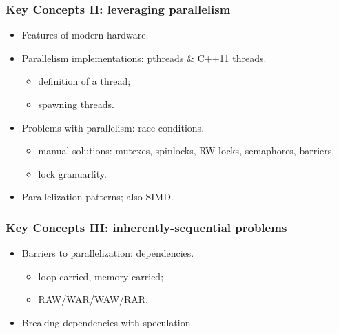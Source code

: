\documentclass[aspectratio=43]{beamer}
\newenvironment{changemargin}[1]{%
  \begin{list}{}{%
    \setlength{\topsep}{0pt}%
    \setlength{\leftmargin}{#1}%
    \setlength{\rightmargin}{1em}
    \setlength{\listparindent}{\parindent}%
    \setlength{\itemindent}{\parindent}%
    \setlength{\parsep}{\parskip}%
  }%
  \item[]}{\end{list}}
\begin{document}
\begin{frame}
  \frametitle{Key Concepts II: leveraging parallelism}

  \begin{changemargin}{2cm}
  \begin{itemize}
    \item Features of modern hardware.

    \item Parallelism implementations: pthreads \& C++11 threads.
      \begin{itemize}
        \item definition of a thread;
        \item spawning threads.
      \end{itemize}

    \item Problems with parallelism: race conditions.
      \begin{itemize}
        \item manual solutions: mutexes, spinlocks, RW locks, semaphores, barriers.
        \item lock granuarlity.
      \end{itemize}

    \item Parallelization patterns; also SIMD.
  \end{itemize}
  \end{changemargin}
\end{frame}

\begin{frame}
  \frametitle{Key Concepts III: inherently-sequential problems}

  \begin{changemargin}{2cm}
  \begin{itemize}
    \item Barriers to parallelization: dependencies.
      \begin{itemize}
        \item loop-carried, memory-carried;
        \item RAW/WAR/WAW/RAR.
      \end{itemize}

    \item Breaking dependencies with speculation.
  \end{itemize}
  \end{changemargin}
\end{frame}
\end{document}
